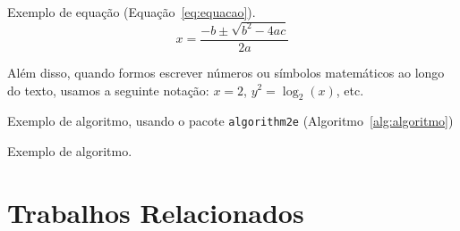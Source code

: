 Exemplo de equação (Equação~\eqref{eq:equacao}).
\begin{equation}
x=\frac{-b\pm\sqrt{b^2-4ac}}{2a}
\label{eq:equacao}
\end{equation}

Além disso, quando formos escrever números ou símbolos matemáticos ao longo do texto, usamos a seguinte notação: $x=2$, $y^2=\log_2(x)$, etc.

Exemplo de algoritmo, usando o pacote \texttt{algorithm2e} (Algoritmo~\ref{alg:algoritmo})
\begin{algorithm}
    \caption{Exemplo de algoritmo.}
    \label{alg:algoritmo}
\end{algorithm}


\section{Trabalhos Relacionados}

